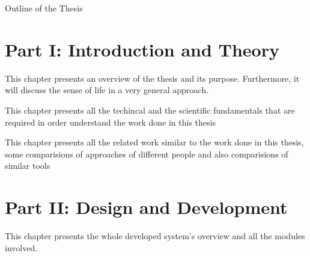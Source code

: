 \clearemptydoublepage

{}

\begin{center}
	\huge{Outline of the Thesis}
\end{center}




\section*{Part I: Introduction and Theory}

  \vspace{1mm}

\noindent  This chapter presents an overview of the thesis and its purpose. Furthermore, 
it will discuss the sense of life in a very general approach.  \\

  \vspace{1mm}

\noindent   This chapter presents all the techincal and the scientific fundamentals that are required in order
understand the work done in this thesis\\

  \vspace{1mm}

\noindent   This chapter presents all the related work similar to the work done in this thesis, some comparisions
of approaches of different people and also comparisions of similar tools \\

\section*{Part II: Design and Development}

  \vspace{1mm}

\noindent  This chapter presents the whole developed system's overview and all the modules involved.

  \vspace{1mm}

